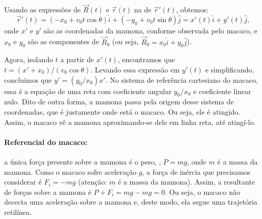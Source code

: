 \begin{question}
\begin{solution}
      Usando as expressões de $\vec R(t)$ e $\vec r(t)$ na de $\vec r'(t)$, obtemos:
      \begin{equation*}
        \vec r'(t) = (-x_0 + v_0 t \cos\theta) \hat i + (-y_0 + v_0 t \sin\theta) \hat j = x'(t) \hat i + y'(t) \hat j,
      \end{equation*}
      onde $x'$ e $y'$ são as coordenadas da mamona, conforme observada pelo macaco, e $x_0$ e $y_0$ são as componentes de $\vec R_0$ (ou seja, $\vec R_0 = x_0 \hat i + y_0 \hat j$).

      Agora, isolando $t$ a partir de $x'(t)$, encontramos que $t = (x' + x_0)/(v_0 \cos\theta)$.
      Levando essa expressão em $y'(t)$ e simplificando, concluimos que $y' = (y_0/x_0) x'$.
      No sistema de referência cartesiano do macaco, essa é a equação de uma reta com coeficiente angular $y_0/x_0$ e coeficiente linear nulo.
      Dito de outra forma, a mamona passa pela origem desse sistema de coordenadas, que é justamente onde está o macaco.
      Ou seja, ele é atingido.
      Assim, o macaco vê a mamona aproximando-se dele em linha reta, até atingí-lo.

      \paragraph{Referencial do macaco:} a única força presente sobre a mamona é o peso, \ie, $P = mg$, onde $m$ é a massa da mamona.
      Como o macaco sofre aceleração $g$, a força de inércia que precisamos considerar é $F_i = -mg$ (atenção: $m$ é a massa da mamona).
      Assim, a resultante de forças sobre a mamona é $P + F_i = mg - mg = 0$.
      Ou seja, o macaco não dececta uma aceleração sobre a mamona e, deste modo, ela segue uma trajetória retilínea.
    \end{solution}
\end{question}